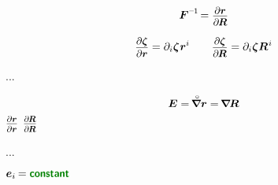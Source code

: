 \[
\bm{F}^{\expminusone} \hspace{-0.3ex} = \scalebox{0.9}{$ \displaystyle \frac{\raisemath{-0.2em}{\partial \bm{r}}}{\partial \hspace{-0.15ex} \bm{R}} $}
\]

\[
\scalebox{0.9}{$ \displaystyle \frac{\raisemath{-0.2em}{\partial \bm{\zeta}}}{\partial \bm{r}} $} = \partial_i \bm{\zeta} \hspace{.1ex} \bm{r}^i
\hspace{2em}
\scalebox{0.9}{$ \displaystyle \frac{\raisemath{-0.2em}{\partial \bm{\zeta}}}{\partial \hspace{-0.15ex} \bm{R}} $} = \partial_i \bm{\zeta} \bm{R}^{\hspace{.1ex}i}
\]



...

\nopagebreak\vspace{-0.2em}\begin{equation*}
\bm{E}
= \tikzmark{unitTensorAsOriginalDerivativeBegin} \hspace{-0.25ex} \boldnablacircled \bm{r} \tikzmark{unitTensorAsOriginalDerivativeEnd}
= \tikzmark{unitTensorAsCurrentDerivativeBegin} \hspace{-0.25ex} \boldnabla \hspace{-0.16ex} \bm{R} \tikzmark{unitTensorAsCurrentDerivativeEnd}
\end{equation*}%
%
{${ \scalebox{0.8}{$ \displaystyle \frac{\raisemath{-0.2em}{\partial \bm{r}}}{\partial \bm{r}} $} }$}%
%
{${ \scalebox{0.8}{$ \displaystyle \frac{\raisemath{-0.2em}{\partial \hspace{-0.15ex} \bm{R}}}{\partial \hspace{-0.15ex} \bm{R}} $} }$}

...

  ${\bm{e}_i \hspace{-0.16ex} = \boldconstant}$

